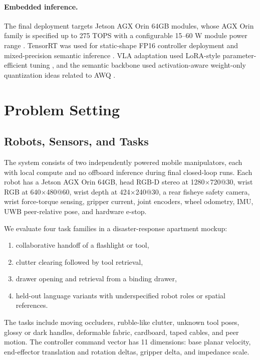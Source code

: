 \documentclass[10pt,twocolumn]{article}
\begin{document}
\paragraph{Embedded inference.}
The final deployment targets Jetson AGX Orin 64GB modules, whose AGX Orin family is specified up to 275 TOPS with a configurable 15--60 W module power range \citep{nvidiajetsonorin2026}. TensorRT was used for static-shape FP16 controller deployment and mixed-precision semantic inference \citep{nvidiatensorrt2026}. VLA adaptation used LoRA-style parameter-efficient tuning \citep{hu2022lora}, and the semantic backbone used activation-aware weight-only quantization ideas related to AWQ \citep{lin2023awq}.

\section{Problem Setting}

\subsection{Robots, Sensors, and Tasks}

The system consists of two independently powered mobile manipulators, each with local compute and no offboard inference during final closed-loop runs. Each robot has a Jetson AGX Orin 64GB, head RGB-D stereo at 1280$\times$720@30, wrist RGB at 640$\times$480@60, wrist depth at 424$\times$240@30, a rear fisheye safety camera, wrist force-torque sensing, gripper current, joint encoders, wheel odometry, IMU, UWB peer-relative pose, and hardware e-stop.

We evaluate four task families in a disaster-response apartment mockup:
\begin{enumerate}[leftmargin=1.3em,itemsep=0.15em]
  \item collaborative handoff of a flashlight or tool,
  \item clutter clearing followed by tool retrieval,
  \item drawer opening and retrieval from a binding drawer,
  \item held-out language variants with underspecified robot roles or spatial references.
\end{enumerate}

The tasks include moving occluders, rubble-like clutter, unknown tool poses, glossy or dark handles, deformable fabric, cardboard, taped cables, and peer motion. The controller command vector has 11 dimensions: base planar velocity, end-effector translation and rotation deltas, gripper delta, and impedance scale.
\end{document}
